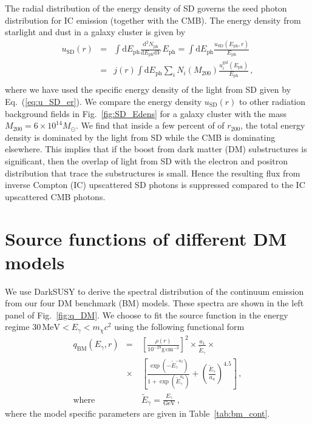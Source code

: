 \documentclass[10pt,aps,pra,reprint,amsmath,amsfonts,amssymb,showpacs,nofootinbib,floatfix]{revtex4-1}
\newcommand{\rmn}{\mathrm}
\newcommand{\ph}{\rmn{ph}}
\newcommand{\eph}{E_\ph}
\newcommand{\gal}{\rmn{gal}}
\newcommand{\sd}{\rmn{SD}}
\newcommand{\msun}{M_\odot}
\newcommand{\cm}{\rmn{cm}}
\newcommand{\egt}{\tilde{E}_\gamma}
\newcommand{\gev}{\rmn{GeV}}
\newcommand{\dd}{\rmn{d}}
\newcommand{\rvir}{r_{200}}
\newcommand{\mvir}{M_{200}}
\newcommand{\eg}{E_\gamma}
\begin{document}
The radial distribution of the energy density of SD governs the seed
photon distribution for IC emission (together with the CMB).  The
energy density from starlight and dust in a galaxy cluster is given by
\begin{eqnarray}
\label{eq:u_SD_r}
u_\sd(r) &=& \int \dd \eph \frac{\dd^2 N_\ph}{\dd \eph \dd V}\,\eph
=\int \dd \eph \frac{u_\sd(\eph, r)}{\eph}
\nonumber \\
&=&  j(r)  \int \dd \eph \sum_i 
N_i(\mvir) \frac{u_i^\gal(\eph)}{\eph}\,, \nonumber \\
\end{eqnarray}
where we have used the specific energy density of the light from SD
given by Eq.~(\ref{eq:u_SD_er}). We compare the energy
density $u_\sd(r)$ to other radiation background fields in
Fig.~\ref{fig:SD_Edens} for a galaxy cluster with the mass
$\mvir=6\times10^{14}\msun$. We find that inside a few percent of of
$\rvir$, the total energy density is dominated by the light from SD
while the CMB is dominating elsewhere. This implies that if the boost
from dark matter (DM) substructures is significant, then the overlap of
light from SD with the electron and positron distribution that trace
the substructures is small. Hence the resulting flux from inverse
Compton (IC) upscattered SD photons is suppressed compared to the IC
upscattered CMB photons.


\section{Source functions of different DM models}
We use {\sc DarkSUSY} to derive the spectral distribution of the
continuum emission from our four DM benchmark (BM) models. These
spectra are shown in the left panel of Fig.~\ref{fig:q_DM}. We choose
to fit the source function in the energy regime $30\,\rmn{MeV}<\eg<
m_\chi c^2$ using the following functional form
\begin{eqnarray}
q_\rmn{BM} (\eg,r)&=&\left[\frac{\rho(r)}{10^{-29}\rmn{g}\,\cm^{-3}}\right]^2
\times\frac{a_1}{\egt}\times\nonumber\\
&\times&\left[\frac{\exp\left(-\egt^{-a_2}\right)}{1+\exp\left(\egt^{a_3}\right)}
+\left(\frac{\egt}{a_4}\right)^{4.5}\right]\,, \nonumber\\
\rmn{where}&\quad& \egt = \frac{\eg}{\gev}\,,
 \label{eq:bm_cont}
\end{eqnarray}
where the model specific parameters are given in
Table~\ref{tab:bm_cont}.
\end{document}
